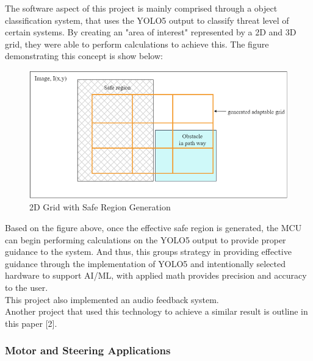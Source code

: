 \noindent The software aspect of this project is mainly comprised through a object classification system, that uses the YOLO5 output to classify threat level of certain systems. By creating an "area of interest" represented by a 2D and 3D grid, they were able to perform calculations to achieve this. The figure demonstrating this concept is show below:
				
\begin{figure}[h]
	\centering
	\includegraphics[width=\textwidth]{./Images/Figure1_Grid_Detection.png}
	\caption{\label{fig:Grid-Generatio}2D Grid with Safe Region Generation}
\end{figure}

\noindent Based on the figure above, once the effective safe region is generated, the MCU can begin performing calculations on the YOLO5 output to provide proper guidance to the system. And thus, this groups strategy in providing effective guidance through the implementation of YOLO5 and intentionally selected hardware to support AI/ML, with  applied math provides precision and accuracy to the user. \\

\noindent This project also implemented an audio feedback system. \\

\noindent Another project that used this technology to achieve a similar result is outline in this paper [2]. \\



\subsubsection{Motor and Steering Applications} 

